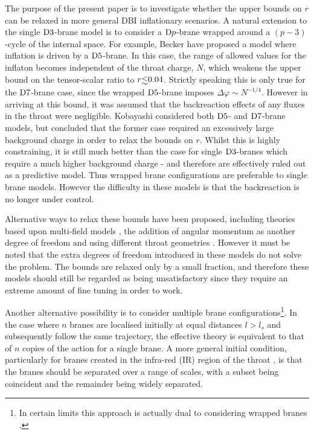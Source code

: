 The purpose of the present paper is to investigate whether the 
upper bounds on $r$ can be relaxed in more general DBI 
inflationary scenarios. 
A natural extension to the single ${\rm D3}$-brane model 
is to consider a ${\rm D}p$-brane wrapped around a $(p-3)$-cycle of the 
internal space. For example, Becker \etal \cite{Becker:2007ui} 
have proposed a model where inflation is driven by a ${\rm D5}$-brane. 
In this case, the range of allowed values for the inflaton 
becomes independent of the throat charge, $N$, which weakens the upper bound on 
the tensor-scalar ratio to $r \lsim 0.04$. Strictly speaking this is 
only true for the ${\rm D7}$-brane case, since the
wrapped ${\rm D5}$-brane imposes 
$\Delta \varphi \sim N^{-1/4}$.
However in arriving at this bound, it was assumed that the 
backreaction effects of any fluxes in the throat were 
negligible. Kobayashi \etal \cite{Kobayashi:2007hm} 
considered both ${\rm D5}$- and
${\rm D7}$-brane models, but concluded that the former case
required an excessively large background charge in 
order to relax the bounds on $r$. Whilst this is highly constraining, it is still much better than
the
case for single ${\rm D3}$-branes which require a much higher background charge - and therefore are
effectively ruled
out as a predictive model. Thus wrapped brane configurations are preferable to single brane models.
However
the difficulty in these models is that the backreaction is no longer under control.


Alternative ways to relax these bounds have been proposed, including
theories based upon multi-field models \cite{Huang:2007hh}, the addition of
angular momentum as another degree of freedom \cite{spinflation} and using
different throat geometries \cite{Gmeiner:2007uw}. However it must be noted that
the extra degrees of freedom introduced in these models do not solve the problem. The 
bounds are relaxed only by a small fraction, and therefore these models should still be 
regarded as being unsatisfactory since they require an extreme amount of fine tuning in order
to work.


Another alternative possibility is to consider 
multiple brane configurations\footnote{In certain limits this approach 
is actually dual to considering wrapped branes \cite{Ward:2007gs}.}. 
In the case where  
$n$ branes are localised initially at equal distances $l > l_s$ and 
subsequently follow the same trajectory, 
the effective theory is equivalent to that of $n$ copies of the
action for a single brane. A more general initial condition, particularly
for branes created in the infra-red (IR) region of the throat
\cite{brane13, DeWolfe:2004qx, Kachru:2002gs}, is that
the branes should be separated over a range of scales, 
with a subset being coincident and the remainder being widely separated. 



